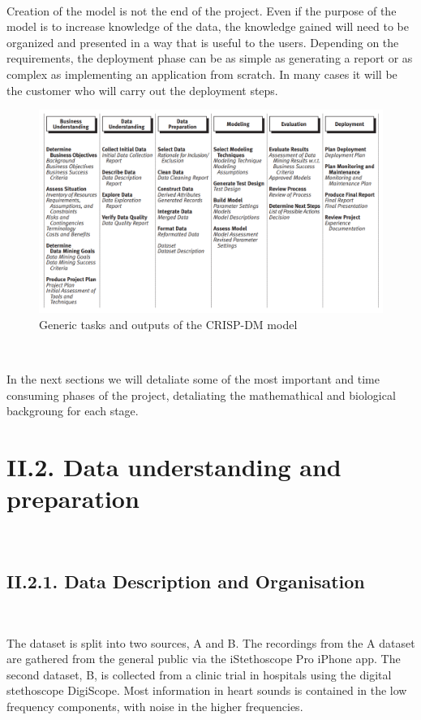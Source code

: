 \documentclass[11pt, a4papper]{report}
\theoremstyle{plain}
\theoremstyle{definition}
\theoremstyle{definition}
\theoremstyle{proposition}
\begin{document}
\

Creation of the model is not the end of the project. Even if the purpose of the model is to increase knowledge of the data, the knowledge gained will need to be organized and presented in a way that is useful to the users. Depending on the requirements, the deployment phase can be as simple as generating a report or as complex as implementing an application from scratch. In many cases it will be the customer who will carry out the deployment steps. 



\begin{figure}[h]
\includegraphics[width=15cm]{crispt.png}
\centering
\caption{Generic tasks and outputs of the CRISP-DM model}
\end{figure}
\

In the next sections we will detaliate some of the most important and time consuming phases of the project, detaliating the mathemathical and biological backgroung for each stage.

\section*{II.2. Data understanding and preparation}

\

\subsection*{II.2.1. Data Description and Organisation}

\

The dataset is split into two sources, A and B. The recordings from the A dataset are gathered from the general public via the iStethoscope Pro iPhone app. The second dataset, B, is collected from a clinic trial in hospitals using the digital stethoscope DigiScope. Most information in heart sounds is contained in the low frequency components, with noise in the higher frequencies.
\\
\end{document}
